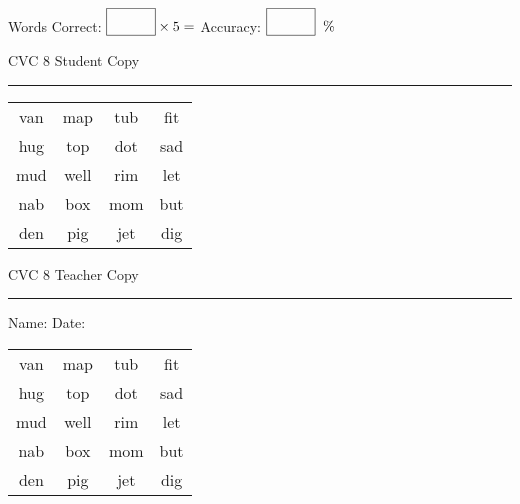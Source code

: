 \documentclass{memoir}
\begin{document}
\normalsize

Words Correct: $\fbox{\phantom{\huge 100}} \times 5 = $ Accuracy: $\fbox{\phantom{\huge 100}}\;\; \%$ 

\vfill

\newpage


\footnotesize \noindent
CVC 8 \hfill Student Copy
\smallskip
\hrule

\huge

\setlength{\tabcolsep}{14pt}
\def\arraystretch{2}

{\selectfont


\begin{vplace}[0.5]
\begin{center}
\begin{tabular}{cccc}
van & map & tub & fit \\
hug & top & dot & sad \\
mud & well & rim & let \\
nab & box & mom & but \\
den & pig & jet & dig \\
\end{tabular}
\end{center}
\end{vplace}

}

\newpage

\footnotesize \noindent
CVC 8 \hfill Teacher Copy
\smallskip
\hrule

\normalsize

\vfill

\noindent
Name: \underline{\hspace{1.75in}} \hfill Date: \underline{\hspace{1in}}

\huge

{\selectfont


\begin{vplace}[0.5]
\begin{center}
\begin{tabular}{cccc}
van & map & tub & fit \\
hug & top & dot & sad \\
mud & well & rim & let \\
nab & box & mom & but \\
den & pig & jet & dig \\
\end{tabular}
\end{center}
\end{vplace}



}
\end{document}
